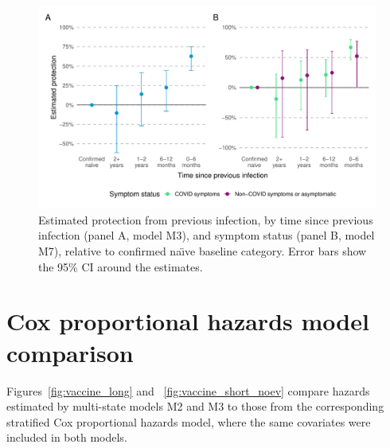 \begin{figure}[htbp!]
    \centering
    \includegraphics[width=\textwidth]{ve_baseline.pdf}
    \caption[Estimated protection from previous infection relative to confirmed na\"{\i}ve baseline category]{Estimated protection from previous infection, by time since previous infection (panel A, model M3), and symptom status (panel B, model M7), relative to confirmed na\"{\i}ve baseline category. Error bars show the 95\% CI around the estimates.}\label{fig:ve_baseline}
\end{figure}

\section{Cox proportional hazards model comparison}

Figures~\ref{fig:vaccine_long} and ~\ref{fig:vaccine_short_noev} compare hazards estimated by multi-state models M2 and M3 to those from the corresponding stratified Cox proportional hazards model, where the same covariates were included in both models.

